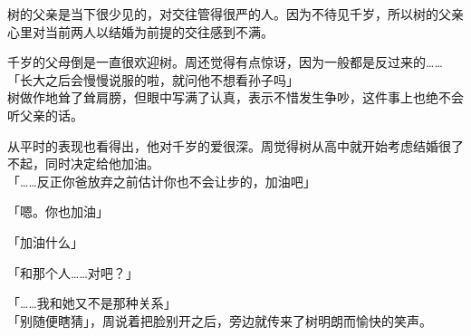 树的父亲是当下很少见的，对交往管得很严的人。因为不待见千岁，所以树的父亲心里对当前两人以结婚为前提的交往感到不满。

千岁的父母倒是一直很欢迎树。周还觉得有点惊讶，因为一般都是反过来的……\\

「长大之后会慢慢说服的啦，就问他不想看孙子吗」\\

树做作地耸了耸肩膀，但眼中写满了认真，表示不惜发生争吵，这件事上也绝不会听父亲的话。

从平时的表现也看得出，他对千岁的爱很深。周觉得树从高中就开始考虑结婚很了不起，同时决定给他加油。\\

「……反正你爸放弃之前估计你也不会让步的，加油吧」

「嗯。你也加油」

「加油什么」

「和那个人……对吧？」

「……我和她又不是那种关系」\\

「别随便瞎猜」，周说着把脸别开之后，旁边就传来了树明朗而愉快的笑声。
